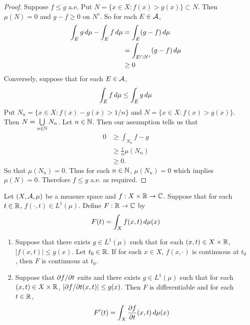 \documentclass{book}
\begin{document}
	\begin{proof}
		Suppose $f \leq g$ a.e. Put $N = \{x\in X: f(x) > g(x)\} \subset N$. Then $\mu(N) = 0$ and $g-f \geq 0$ on $N^c$. So for each $E \in \mathcal{A}$,
		\begin{align*}
			\int_E g \, d \mu - \int_E f \, d \mu 
			&= \int_E (g-f) \, d \mu\\
			&= \int_{E \cap N^c} (g-f) \, d \mu\\
			& \geq 0
		\end{align*} 
		Conversely, suppose that for each $E \in \mathcal{A}$, 
		$$\int_E f\, d \mu \leq \int_E g \, d \mu$$ 
		Put $N_n = \{x \in X: f(x) - g(x) > 1/n\}$ and $N = \{x \in X: f(x) > g(x)\}$. Then $N = \bigcup\limits_{n \in \mathbb{N}}N_n$. Let $n \in \mathbb{N}$. Then our assumption tells us that 
		\begin{align*}
			0 
			&\geq \int_{N_n} f-g\\
			& \geq \frac{1}{n} \mu(N_n)\\
			& \geq 0.
		\end{align*} 
		So that $\mu(N_n) = 0$. Thus for each $n \in \mathbb{N}$, $\mu(N_n) = 0$ which implies $\mu(N) = 0$. Therefore $f \leq g$ a.e. as required. 
	\end{proof}
	
	\begin{ex}  
	Let $(X, \mathcal{A}, \mu)$ be a measure space and $f:X \times \mathbb{R} \rightarrow \mathbb{C}$. Suppose that for each $t \in \mathbb{R}$, $f(\cdot, t) \in L^1(\mu)$. Define $F: \mathbb{R} \rightarrow \mathbb{C}$ by 
	$$F(t) = \int_X f(x, t) \, d \mu(x)$$ 
	\begin{enumerate}
	\item Suppose that there exists $g \in L^1(\mu)$ such that for each $(x, t) \in X \times \mathbb{R}$, $|f(x,t)| \leq g(x)$. Let $t_0 \in \mathbb{R}$. If for each $x \in X$, $f(x, \cdot)$ is continuous at $t_0$, then $F$ is continuous at $t_0$. 
 	\item Suppose that $\partial f / \partial t$ exits and there exists $g \in L^1(\mu)$ such that for each $(x, t) \in X \times \mathbb{R}$, $|\partial f / \partial t(x,t) | \leq g(x)$. Then $F$ is differentiable and for each $t \in \mathbb{R}$, $$F'(t) = \int_X \frac{\partial f}{\partial t}(x, t) \, d \mu(x)$$
	\end{enumerate}
	\end{ex}
	
\end{document}
